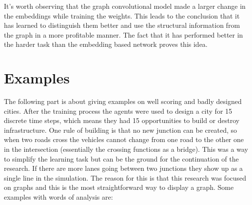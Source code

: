 \documentclass[
]{elteikthesis}[2023/04/10]
\begin{document}
It's worth observing that the graph convolutional model made a larger
change in the embeddings while training the weights. This leads to
the conclusion that it has learned to distinguish them better and
use the structural information from the graph in a more profitable
manner. The fact that it has performed better in the harder task than
the embedding based network proves this idea.

\section{Examples}

The following part is about giving examples on well scoring and badly
designed cities. After the training process the agents were used to
design a city for 15 discrete time steps, which means they had 15
opportunities to build or destroy infrastructure. One rule of building
is that no new junction can be created, so when two roads cross the
vehicles cannot change from one road to the other one in the intersection
(essentially the crossing functions as a bridge). This was a way to
simplify the learning task but can be the ground for the continuation
of the research. If there are more lanes going between two junctions
they show up as a single line in the simulation. The reason for this
is that this research was focused on graphs and this is the most straightforward
way to display a graph. Some examples with words of analysis are:
\end{document}
